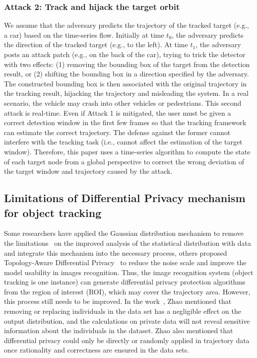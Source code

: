 \documentclass[trans]{IEEEtran}
\begin{document}
\subsubsection{Attack 2: Track and hijack the target orbit}
We assume that the adversary predicts the trajectory of the tracked target (e.g., a car) based on the time-series flow. Initially at time $t_0$, the adversary predicts the direction of the tracked target (e.g., to the left). At time $t_1$, the adversary posts an attack patch (e.g., on the back of the car), trying to trick the detector with two effects: (1) removing the bounding box of the target from the detection result, or (2) shifting the bounding box in a direction specified by the adversary. The constructed bounding box is then associated with the original trajectory in the tracking result, hijacking the trajectory and misleading the system. In a real scenario, the vehicle may crash into other vehicles or pedestrians. This second attack is real-time. Even if Attack 1 is mitigated, the user must be given a correct detection window in the first few frames so that the tracking framework can estimate the correct trajectory. The defense against the former cannot interfere with the tracking task (i.e., cannot affect the estimation of the target window). Therefore, this paper uses a time-series algorithm to compute the state of each target node from a global perspective to correct the wrong deviation of the target window and trajectory caused by the attack.


\subsection{Limitations of Differential Privacy mechanism for object tracking}
Some researchers have applied the Gaussian distribution mechanism to remove the limitations~\cite{liu2018generalized} on the improved analysis of the statistical distribution with data and integrate this mechanism into the necessary process, others proposed Topology-Aware Differential Privacy~\cite{guo2021topology} to reduce the noise scale and improve the model usability in images recognition. Thus, the image recognition system (object tracking is one instance) can generate differential privacy protection algorithms from the region of interest (ROI), which may cover the trajectory area. However, this process still needs to be improved. In the work~\cite{zhao2020novel}, Zhao mentioned that removing or replacing individuals in the data set has a negligible effect on the output distribution, and the calculations on private data will not reveal sensitive information about the individuals in the dataset. Zhao also mentioned that differential privacy could only be directly or randomly applied in trajectory data once rationality and correctness are ensured in the data sets. 
\end{document}
